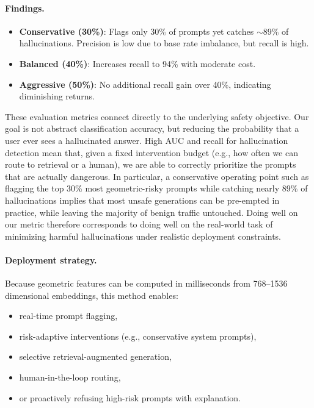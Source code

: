 \documentclass{article}
\begin{document}
\paragraph{Findings.}
\begin{itemize}
    \item \textbf{Conservative (30\%)}: Flags only 30\% of prompts yet catches $\sim$89\% of hallucinations. Precision is low due to base rate imbalance, but recall is high.
    \item \textbf{Balanced (40\%)}: Increases recall to 94\% with moderate cost.
    \item \textbf{Aggressive (50\%)}: No additional recall gain over 40\%, indicating diminishing returns.
\end{itemize}

These evaluation metrics connect directly to the underlying safety objective. Our goal is not abstract classification accuracy, but reducing the probability that a user ever sees a hallucinated answer. High AUC and recall for hallucination detection mean that, given a fixed intervention budget (e.g., how often we can route to retrieval or a human), we are able to correctly prioritize the prompts that are actually dangerous. In particular, a conservative operating point such as flagging the top 30\% most geometric-risky prompts while catching nearly 89\% of hallucinations implies that most unsafe generations can be pre-empted in practice, while leaving the majority of benign traffic untouched. Doing well on our metric therefore corresponds to doing well on the real-world task of minimizing harmful hallucinations under realistic deployment constraints.

\paragraph{Deployment strategy.} Because geometric features can be computed in milliseconds from 768--1536 dimensional embeddings, this method enables:
\begin{itemize}
    \item real-time prompt flagging,
    \item risk-adaptive interventions (e.g., conservative system prompts),
    \item selective retrieval-augmented generation,
    \item human-in-the-loop routing,
    \item or proactively refusing high-risk prompts with explanation.
\end{itemize}
\end{document}
